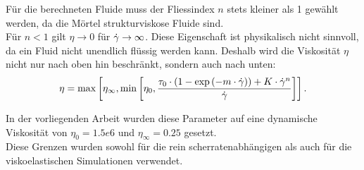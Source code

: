Für die berechneten Fluide muss der Fliessindex $n$ stets kleiner als 1 gewählt werden, da die Mörtel strukturviskose Fluide sind.\\
Für $n<1$ gilt $\eta\rightarrow0$ für $\dot\gamma\rightarrow\infty$. Diese Eigenschaft ist physikalisch nicht sinnvoll, da ein Fluid nicht unendlich flüssig werden kann. Deshalb wird die Viskosität $\eta$ nicht nur nach oben hin beschränkt, sondern auch nach unten:
%
\begin{equation}
    \eta = \max \left[ \eta_\infty, \min \left[ \eta_0, \frac{\tau_0\cdot\left(1-\exp\left( -m\cdot\dot\gamma \right)\right)+K\cdot \dot\gamma^n}{\dot\gamma} \right]\right].
\end{equation}
%

In der vorliegenden Arbeit wurden diese Parameter auf eine dynamische Viskosität von $\eta_0=1.5e6$ und $\eta_\infty=0.25$ gesetzt.\\
Diese Grenzen wurden sowohl für die rein scherratenabhängigen als auch für die viskoelastischen Simulationen verwendet.

